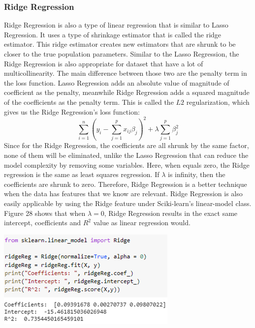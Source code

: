 \documentclass[a4paper,12pt]{report}
\begin{document}
\subsubsection{Ridge Regression}
Ridge Regression is also a type of linear regression that is similar to Lasso Regression. It uses a type of shrinkage estimator that is called the ridge estimator. This ridge estimator creates new estimators that are shrunk to be closer to the true population parameters. Similar to the Lasso Regression, the Ridge Regression is also appropriate for dataset that have a lot of multicollinearity. The main difference between those two are the penalty term in the loss function. Lasso Regression adds an absolute value of magnitude of coefficient as the penalty, meanwhile Ridge Regression adds a squared magnitude of the coefficients as the penalty term. This is called the $L2$ regularization, which gives us the Ridge Regression’s loss function:
$$\sum_{i=1}^n\left(y_i-\sum_{j=1}^px_{ij}\beta_j\right)^2+\lambda\sum_{j=1}^p\beta_j^2$$
Since for the Ridge Regression, the coefficients are all shrunk by the same factor, none of them will be eliminated, unlike the Lasso Regression that can reduce the model complexity by removing some variables. Here, when  equals zero, the Ridge regression is the same as least squares regression. If $\lambda$ is infinity, then the coefficients are shrunk to zero. Therefore, Ridge Regression is a better technique when the data has features that we know are relevant. Ridge Regression is also easily applicable by using the Ridge feature under Sciki-learn’s linear-model class. Figure 28 shows that when $\lambda=0$, Ridge Regression results in the exact same intercept, coefficients and $R^2$ value as linear regression would.

\begin{center}
    \captionsetup{type=figure}
    \includegraphics[width=.9\linewidth]{media/Ridge1.png}
\end{center}
\end{document}
